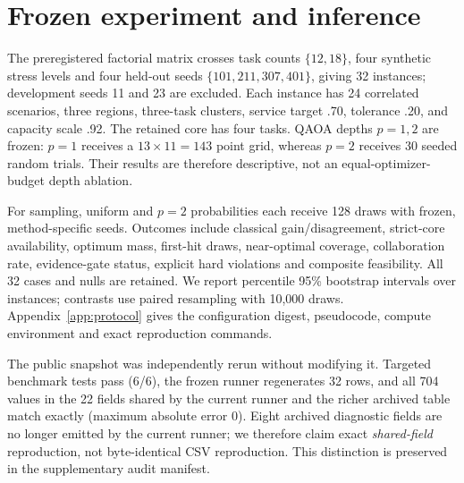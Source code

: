 \section{Frozen experiment and inference}
\label{sec:experiments}

The preregistered factorial matrix crosses task counts $\{12,18\}$, four synthetic stress levels and four held-out seeds $\{101,211,307,401\}$, giving 32 instances; development seeds 11 and 23 are excluded. Each instance has 24 correlated scenarios, three regions, three-task clusters, service target .70, tolerance .20, and capacity scale .92. The retained core has four tasks. QAOA depths $p=1,2$ are frozen: $p=1$ receives a $13\times11=143$ point grid, whereas $p=2$ receives 30 seeded random trials. Their results are therefore descriptive, not an equal-optimizer-budget depth ablation.

For sampling, uniform and $p=2$ probabilities each receive 128 draws with frozen, method-specific seeds. Outcomes include classical gain/disagreement, strict-core availability, optimum mass, first-hit draws, near-optimal coverage, collaboration rate, evidence-gate status, explicit hard violations and composite feasibility. All 32 cases and nulls are retained. We report percentile 95\% bootstrap intervals over instances; contrasts use paired resampling with 10,000 draws. Appendix~\ref{app:protocol} gives the configuration digest, pseudocode, compute environment and exact reproduction commands.



The public snapshot was independently rerun without modifying it. Targeted benchmark tests pass (6/6), the frozen runner regenerates 32 rows, and all 704 values in the 22 fields shared by the current runner and the richer archived table match exactly (maximum absolute error 0). Eight archived diagnostic fields are no longer emitted by the current runner; we therefore claim exact \emph{shared-field} reproduction, not byte-identical CSV reproduction. This distinction is preserved in the supplementary audit manifest.
